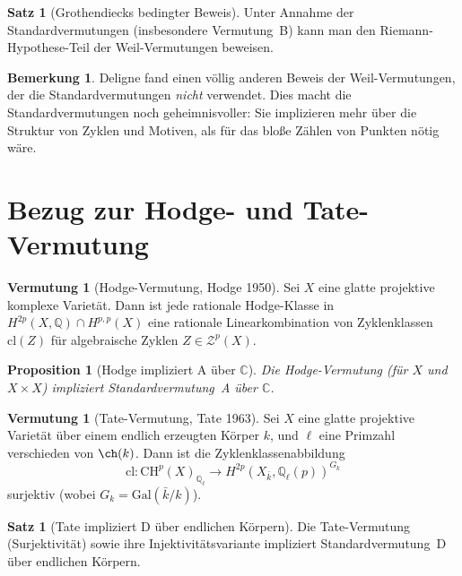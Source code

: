\documentclass[12pt,a4paper]{amsart}
\newtheorem{proposition}[theorem]{Proposition}
\theoremstyle{definition}
\newtheorem{satz}[theorem]{Satz}
\newtheorem{vermutung}[theorem]{Vermutung}
\newtheorem{bemerkung}[theorem]{Bemerkung}
\newcommand{\Q}{\mathbb{Q}}
\newcommand{\C}{\mathbb{C}}
\newcommand{\Gal}{\mathrm{Gal}}
\newcommand{\CH}{\mathrm{CH}}
\newcommand{\cl}{\mathrm{cl}}
\begin{document}
\begin{satz}[Grothendiecks bedingter Beweis]
Unter Annahme der Standardvermutungen (insbesondere Vermutung~B) kann man
den Riemann-Hypothese-Teil der Weil-Vermutungen beweisen.
\end{satz}

\begin{bemerkung}
Deligne fand einen völlig anderen Beweis der Weil-Vermutungen, der die
Standardvermutungen \emph{nicht} verwendet.  Dies macht die Standardvermutungen
noch geheimnisvoller: Sie implizieren mehr über die Struktur von Zyklen
und Motiven, als für das bloße Zählen von Punkten nötig wäre.
\end{bemerkung}

\section{Bezug zur Hodge- und Tate-Vermutung}\label{sec:hodge}

\begin{vermutung}[Hodge-Vermutung, Hodge 1950]
Sei $X$ eine glatte projektive komplexe Varietät.  Dann ist jede rationale
Hodge-Klasse in $H^{2p}(X,\Q) \cap H^{p,p}(X)$ eine rationale Linearkombination
von Zyklenklassen $\cl(Z)$ für algebraische Zyklen $Z \in \mathcal{Z}^p(X)$.
\end{vermutung}

\begin{proposition}[Hodge impliziert A über $\C$]
Die Hodge-Vermutung (für $X$ und $X \times X$) impliziert Standardvermutung~A
über $\C$.
\end{proposition}

\begin{vermutung}[Tate-Vermutung, Tate 1963]
Sei $X$ eine glatte projektive Varietät über einem endlich erzeugten Körper $k$,
und $\ell$ eine Primzahl verschieden von $\ch(k)$.  Dann ist die Zyklenklassenabbildung
\[
  \cl: \CH^p(X)_{\Q_\ell} \to H^{2p}(X_{\bar k}, \Q_\ell(p))^{G_k}
\]
surjektiv (wobei $G_k = \Gal(\bar k/k)$).
\end{vermutung}

\begin{satz}[Tate impliziert D über endlichen Körpern]
Die Tate-Vermutung (Surjektivität) sowie ihre Injektivitätsvariante impliziert
Standardvermutung~D über endlichen Körpern.
\end{satz}

\end{document}
